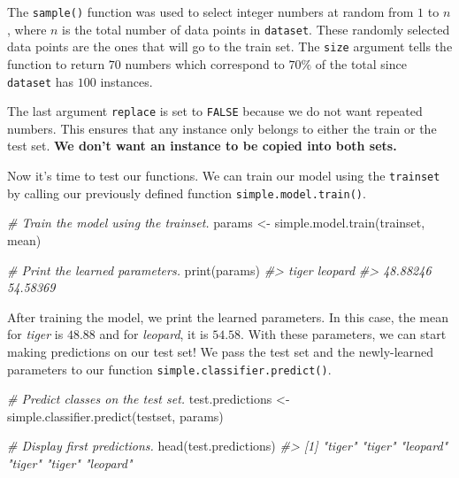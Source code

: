 \documentclass[
  11pt,
]{krantz}
\makeatletter
\newenvironment{Shaded}{\begin{snugshade}}{\end{snugshade}}
\newcommand{\CommentTok}[1]{\textcolor[rgb]{0.37,0.37,0.37}{\textit{#1}}}
\newcommand{\FunctionTok}[1]{\textcolor[rgb]{0,0,0}{#1}}
\newcommand{\NormalTok}[1]{#1}
\newcommand{\OtherTok}[1]{\textcolor[rgb]{0.37,0.37,0.37}{#1}}
\newenvironment{kframe}{%
\medskip{}
\setlength{\fboxsep}{.8em}
 \def\at@end@of@kframe{}%
 \ifinner\ifhmode%
  \def\at@end@of@kframe{\end{minipage}}%
  \begin{minipage}{\columnwidth}%
 \fi\fi%
 \def\FrameCommand##1{\hskip\@totalleftmargin \hskip-\fboxsep
 \colorbox{shadecolor}{##1}\hskip-\fboxsep
     \hskip-\linewidth \hskip-\@totalleftmargin \hskip\columnwidth}%
 \MakeFramed {\advance\hsize-\width
   \@totalleftmargin\z@ \linewidth\hsize
   \@setminipage}}%
 {\par\unskip\endMakeFramed%
 \at@end@of@kframe}
\newenvironment{rmdblock}[1]
  {
  \begin{itemize}
  \renewcommand{\labelitemi}{
    \raisebox{-.7\height}[0pt][0pt]{
      {\setkeys{Gin}{width=3em,keepaspectratio}\texttt{[image: images/icons/\#1]}}
    }
  }
  \setlength{\fboxsep}{1em}
  \begin{kframe}
  \item
  }
  {
  \end{kframe}
  \end{itemize}
  }
\newenvironment{rmdcaution}
  {\begin{rmdblock}{caution}}
  {\end{rmdblock}}
\makeatother
\begin{document}
The \texttt{sample()} function was used to select integer numbers at random from \(1\) to \(n\), where \(n\) is the total number of data points in \texttt{dataset}. These randomly selected data points are the ones that will go to the train set. The \texttt{size} argument tells the function to return \(70\) numbers which correspond to \(70\%\) of the total since \texttt{dataset} has \(100\) instances.

\begin{rmdcaution}
The last argument \texttt{replace} is set to \texttt{FALSE} because we do not want repeated numbers. This ensures that any instance only belongs to either the train or the test set. \textbf{We don't want an instance to be copied into both sets.}
\end{rmdcaution}

Now it's time to test our functions. We can train our model using the \texttt{trainset} by calling our previously defined function \texttt{simple.model.train()}.

\begin{Shaded}
\begin{Highlighting}[]
\CommentTok{\# Train the model using the trainset.}
\NormalTok{params }\OtherTok{\textless{}{-}} \FunctionTok{simple.model.train}\NormalTok{(trainset, mean)}

\CommentTok{\# Print the learned parameters.}
\FunctionTok{print}\NormalTok{(params)}
\CommentTok{\#\textgreater{}    tiger  leopard }
\CommentTok{\#\textgreater{} 48.88246 54.58369}
\end{Highlighting}
\end{Shaded}

After training the model, we print the learned parameters. In this case, the mean for \emph{tiger} is \(48.88\) and for \emph{leopard}, it is \(54.58\). With these parameters, we can start making predictions on our test set! We pass the test set and the newly-learned parameters to our function \texttt{simple.classifier.predict()}.

\begin{Shaded}
\begin{Highlighting}[]
\CommentTok{\# Predict classes on the test set.}
\NormalTok{test.predictions }\OtherTok{\textless{}{-}} \FunctionTok{simple.classifier.predict}\NormalTok{(testset, params)}

\CommentTok{\# Display first predictions.}
\FunctionTok{head}\NormalTok{(test.predictions)}
\CommentTok{\#\textgreater{} [1] "tiger"   "tiger"   "leopard" "tiger"   "tiger"   "leopard"}
\end{Highlighting}
\end{Shaded}
\end{document}
